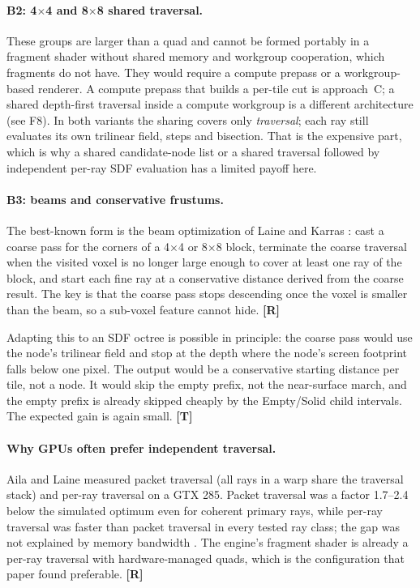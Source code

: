 \documentclass[11pt,a4paper]{article}
\newcommand{\evR}{\textsf{\textbf{\color{evR}[R]}}}
\newcommand{\evT}{\textsf{\textbf{\color{evT}[T]}}}
\theoremstyle{plain}
\theoremstyle{definition}
\theoremstyle{remark}
\begin{document}
\paragraph{B2: 4$\times$4 and 8$\times$8 shared traversal.} These groups are
larger than a quad and cannot be formed portably in a fragment shader without
shared memory and workgroup cooperation, which fragments do not have. They
would require a compute prepass or a workgroup-based renderer. A compute
prepass that builds a per-tile cut is approach~C; a shared depth-first
traversal inside a compute workgroup is a different architecture (see F8).
In both variants the sharing covers only \emph{traversal}; each ray still
evaluates its own trilinear field, steps and bisection. That is the expensive
part, which is why a shared candidate-node list or a shared traversal followed
by independent per-ray SDF evaluation has a limited payoff here.

\paragraph{B3: beams and conservative frustums.} The best-known form is the
beam optimization of Laine and Karras \cite{laine2010}: cast a coarse pass for
the corners of a 4$\times$4 or 8$\times$8 block, terminate the coarse traversal
when the visited voxel is no longer large enough to cover at least one ray of
the block, and start each fine ray at a conservative distance derived from the
coarse result. The key is that the coarse pass stops descending once the voxel
is smaller than the beam, so a sub-voxel feature cannot hide. \evR

Adapting this to an SDF octree is possible in principle: the coarse pass would
use the node's trilinear field and stop at the depth where the node's screen
footprint falls below one pixel. The output would be a conservative starting
distance per tile, not a node. It would skip the empty prefix, not the
near-surface march, and the empty prefix is already skipped cheaply by the
Empty/Solid child intervals. The expected gain is again small. \evT

\paragraph{Why GPUs often prefer independent traversal.} Aila and Laine
measured packet traversal (all rays in a warp share the traversal stack) and
per-ray traversal on a GTX 285. Packet traversal was a factor 1.7--2.4 below
the simulated optimum even for coherent primary rays, while per-ray traversal
was faster than packet traversal in every tested ray class; the gap was not
explained by memory bandwidth \cite{aila2009}. The engine's fragment shader is
already a per-ray traversal with hardware-managed quads, which is the
configuration that paper found preferable. \evR
\end{document}
